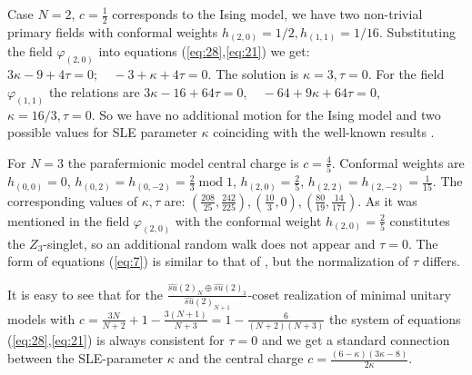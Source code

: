 \documentclass{jetpl}
\begin{document}
Case $N=2$, $c=\frac{1}{2}$ corresponds to the Ising model, we have two non-trivial primary fields with conformal weights $h_{(2,0)}=1/2, h_{(1,1)}=1/16$. Substituting the field $\varphi_{(2,0)}$ into equations (\ref{eq:28},\ref{eq:21}) we get: $3\kappa-9+4\tau =0;\quad -3+\kappa+4\tau=0$. The solution is $\kappa=3, \tau=0$. For the field $\varphi_{(1,1)}$ the relations are $3\kappa-16+64\tau=0,\quad -64+9\kappa + 64\tau=0$, $\kappa=16/3, \tau=0$. So we have no additional motion for the Ising model and two possible values for SLE parameter $\kappa$  coinciding with the well-known results \cite{schramm2006conformally}.

For $N=3$ the parafermionic model central charge is $c=\frac{4}{5}$. Conformal weights are $h_{(0,0)}=0$, $h_{(0,2)}=h_{(0,-2)}=\frac{2}{3}\; \mathrm{mod}\; 1$, $h_{(2,0)}=\frac{2}{5}$, $h_{(2,2)}=h_{(2,-2)}=\frac{1}{15}$.  The corresponding values of $\kappa,\tau$ are: $(\frac{208}{25},\frac{242}{225}), (\frac{10}{3},0),(\frac{80}{19},\frac{14}{171})$. As it  was mentioned in \cite{santachiara2008sle} the field $\varphi_{(2,0)}$ with the conformal weight $h_{(2,0)}=\frac{2}{5}$ constitutes the $Z_{3}$-singlet, so  an additional random walk does not appear and $\tau=0$. The form of equations (\ref{eq:7}) is similar to that of \cite{santachiara2008sle}, but the normalization of $\tau$ differs.

It is easy to see that for the $\frac{\hat{su}(2)_{N}\oplus \hat{su}(2)_{1}}{\hat{su}(2)_{N+1}}$-coset realization of minimal unitary models with $c=\frac{3N}{N+2}+1-\frac{3(N+1)}{N+3}=1-\frac{6}{(N+2)(N+3)}$ the system of equations (\ref{eq:28},\ref{eq:21}) is always consistent for $\tau=0$ and we get a standard connection between the SLE-parameter $\kappa$ and the central charge $c=\frac{(6-\kappa)(3\kappa-8)}{2\kappa}$.
\end{document}

